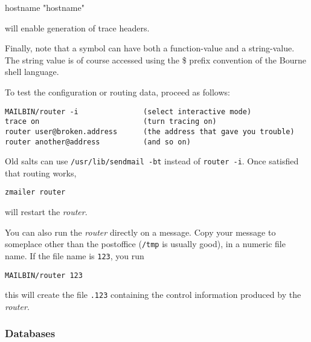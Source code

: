 \begin{tscreen}
hostname "hostname"
\end{tscreen}


will enable generation of trace headers.

Finally, note that a symbol can have both a function-value and a
string-value.  The string value is of course accessed using the \$ prefix
convention of the Bourne shell language.

To test the configuration or routing data, proceed as follows:

\begin{tscreen}
\begin{verbatim}
MAILBIN/router -i               (select interactive mode)
trace on                        (turn tracing on)
router user@broken.address      (the address that gave you trouble)
router another@address          (and so on)
\end{verbatim}
\end{tscreen}


Old salts can use {\tt /usr/lib/sendmail -bt} instead of {\tt router -i}. Once satisfied that routing works,

\begin{tscreen}
\begin{verbatim}
zmailer router
\end{verbatim}
\end{tscreen}


will restart the {\em router\/}.

You can also run the {\em router\/} directly on a message.  Copy your message
to someplace other than the postoffice ({\tt /tmp} is usually good), in a
numeric file name.  If the file name is {\tt 123}, you run

\begin{tscreen}
\begin{verbatim}
MAILBIN/router 123
\end{verbatim}
\end{tscreen}


this will create the file {\tt .123} containing the control information
produced by the {\em router\/}.






\subsubsection{Databases\label{Databases}}



